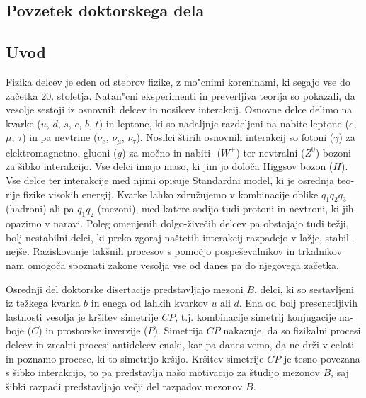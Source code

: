 \documentclass[headings=standardclasses,headings=big,oneside,a4paper,openany,12pt]{scrbook}
\begin{document}
\begin{otherlanguage}{slovene}
\chapter{Povzetek doktorskega dela}

\section{Uvod}
Fizika delcev je eden od stebrov fizike, z mo"cnimi koreninami, ki segajo vse do začetka 20. stoletja. Natan"cni eksperimenti in preverljiva teorija so pokazali, da vesolje sestoji iz osnovnih delcev in nosilcev interakcij. Osnovne delce delimo na kvarke ($u$, $d$, $s$, $c$, $b$, $t$) in leptone, ki so nadaljnje razdeljeni na nabite leptone ($e$, $\mu$, $\tau$) in pa nevtrine ($\nu_e$, $\nu_\mu$, $\nu_\tau$). Nosilci štirih osnovnih interakcij so fotoni ($\gamma$) za elektromagnetno, gluoni ($g$) za močno in nabiti- ($W^\pm$) ter nevtralni ($Z^0$) bozoni za šibko interakcijo. Vse delci imajo maso, ki jim jo določa Higgsov bozon ($H$). Vse delce ter interakcije med njimi opisuje Standardni model, ki je osrednja teorije fizike visokih energij. Kvarke lahko združujemo v kombinacije oblike $q_1 q_2 q_3$ (hadroni) ali pa $q_1 \bar{q}_2$ (mezoni), med katere sodijo tudi protoni in nevtroni, ki jih opazimo v naravi. Poleg omenjenih dolgo-živečih delcev pa obstajajo tudi težji, bolj nestabilni delci, ki preko zgoraj naštetih interakcij razpadejo v lažje, stabilnejše. Raziskovanje takšnih procesov s pomočjo pospeševalnikov in trkalnikov nam omogoča spoznati zakone vesolja vse od danes pa do njegovega začetka.

Osrednji del doktorske disertacije predstavljajo mezoni $B$, delci, ki so sestavljeni iz težkega kvarka $b$ in enega od lahkih kvarkov $u$ ali $d$. Ena od bolj presenetljivih lastnosti vesolja je kršitev simetrije $CP$, t.j. kombinacije simetrij konjugacije naboje ($C$) in prostorske inverzije ($P$). Simetrija $CP$ nakazuje, da so fizikalni procesi delcev in zrcalni procesi antidelcev enaki, kar pa danes vemo, da ne drži v celoti in poznamo procese, ki to simetrijo kršijo. Kršitev simetrije $CP$ je tesno povezana s šibko interakcijo, to pa predstavlja našo motivacijo za študijo mezonov $B$, saj šibki razpadi predstavljajo večji del razpadov mezonov $B$.


\end{otherlanguage}
\end{document}
